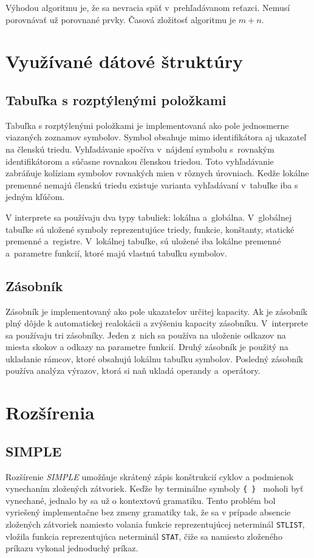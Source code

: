 \documentclass[11pt,a4paper]{article}
\begin{document}
	Výhodou algoritmu je, že sa nevracia späť v~prehľadávanom reťazci. Nemusí porovnávať už porovnané prvky. Časová zložitosť algoritmu je ${m+n}$.
	
	\section{Využívané dátové štruktúry}
	\label{struktury}
	
	\subsection{Tabuľka s rozptýlenými položkami}
	Tabuľka s rozptýlenými položkami je implementovaná ako pole jednosmerne
	viazaných zoznamov symbolov. Symbol obsahuje
	mimo identifikátora aj ukazateľ na členskú triedu. Vyhľadávanie spočíva
	v~nájdení symbolu s~rovnakým identifikátorom
	a súčasne rovnakou členskou triedou. Toto vyhľadávanie zabráňuje kolíziam
	symbolov rovnakých mien v rôznych úrovniach.
	Kedže lokálne premenné nemajú členskú triedu existuje varianta vyhľadávaní v~tabuľke
	iba s jedným kľúčom.
	
	V interprete sa používaju dva typy tabuliek: lokálna a~globálna. V~globálnej
	tabuľke sú uložené symboly reprezentujúce triedy, funkcie, konštanty, statické
	premenné a~registre. V~lokálnej tabuľke, sú uložené iba lokálne premenné a~parametre
	funkcií, ktoré majú vlastnú tabuľku symbolov.
	
	\subsection{Zásobník}
	Zásobník je implementovaný ako pole ukazateľov určitej kapacity. Ak je zásobník
	plný dôjde k automatickej realokácii a zvýšeniu kapacity zásobníku.
	V~interprete sa používaju tri zásobníky. Jeden z~nich sa používa na uloženie
	odkazov na miesta skokov a odkazy na parametre funkcií. Druhý zásobník je
	použitý na ukladanie rámcov, ktoré obsahujú lokálnu tabuľku symbolov.
	Posledný zásobník používa analýza výrazov, ktorá si naň ukladá operandy a~operátory.
	
	\section{Rozšírenia}
	\label{rozsirenia}
	
	\subsection{SIMPLE}
	Rozšírenie \emph{SIMPLE} umožňuje skrátený zápis konštrukcií cyklov a
	podmienok vynechaním zložených zátvoriek. Keďže by terminálne symboly
	\texttt{\{ \} } moholi byť vynechané, jednalo by sa už o kontextovú gramatiku.
	Tento problém bol vyriešený implementačne bez zmeny
	gramatiky tak, že sa v prípade absencie zložených zátvoriek namiesto volania
	funkcie reprezentujúcej neterminál \texttt{STLIST}, vložila
	funkcia reprezentujúca neterminál \texttt{STAT}, čiže sa namiesto zloženého
	príkazu vykonal jednoduchý príkaz.
	
\end{document}
